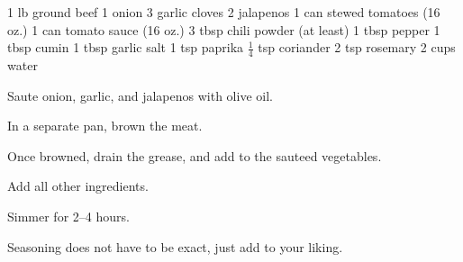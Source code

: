 \dishtype{\main}
\begin{ingreds}
    1 lb ground beef
    1 onion
    3 garlic cloves
    2 jalapenos 
    1 can stewed tomatoes (16 oz.)
    1 can tomato sauce (16 oz.)
    3 tbsp chili powder (at least)
    1 tbsp pepper
    1 tbsp cumin
    1 tbsp garlic salt
    1 tsp paprika
    $\frac{1}{4}$ tsp coriander
    2 tsp rosemary
    2 cups water
\end{ingreds}
\begin{method}
    Saute onion, garlic, and jalapenos with olive oil.\par
    In a separate pan, brown the meat.\par
    Once browned, drain the grease, and add to the sauteed vegetables.\par
    Add all other ingredients.\par
    Simmer for 2--4 hours.\par
    Seasoning does not have to be exact, just add to your liking. 
\end{method}